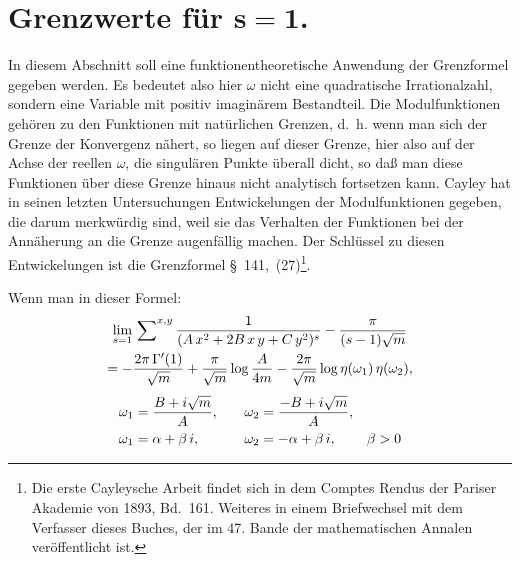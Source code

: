\documentclass[12pt,a4paper]{article}
\theoremstyle{definition}
\begin{document}
\vspace{12pt}

\section{Grenzwerte für $\boldsymbol{s = 1}$.}

In diesem Abschnitt soll eine funktionentheoretische Anwendung der 
Grenzformel gegeben werden. Es bedeutet also hier $\omega$ nicht eine 
quadratische Irrationalzahl, sondern eine Variable mit positiv imaginärem 
Bestandteil. Die Modulfunktionen gehören zu den Funktionen mit natürlichen 
Grenzen, d.~h. wenn man sich der Grenze der Konvergenz nähert, so liegen 
auf dieser Grenze, hier also auf der Achse der reellen $\omega$, die 
singulären Punkte überall dicht, so daß man diese Funktionen über diese 
Grenze hinaus nicht analytisch fortsetzen kann. Cayley hat in seinen 
letzten Untersuchungen Entwickelungen der Modulfunktionen gegeben, die 
darum merkwürdig sind, weil sie das Verhalten der Funktionen bei der 
Annäherung an die Grenze augenfällig machen. Der Schlüssel zu diesen 
Entwickelungen ist die Grenzformel \S~141,~(27)\footnote{Die erste Cayleysche 
Arbeit findet sich in dem Comptes Rendus der Pariser Akademie von 1893, 
Bd.~161. Weiteres in einem Briefwechsel mit dem Verfasser dieses Buches, 
der im 47. Bande der mathematischen Annalen veröffentlicht ist.}.

Wenn man in dieser Formel:
\begin{multline}
\lim_{s=1}\sideset{}{^{x,y}}\sum
\frac{1}{(A\,x^{2} + 2B\,x\,y + C\,y^{2})^{s}}
- \frac{\pi}{(s-1)\sqrt{m}}\\
= -\frac{2\pi\,\Gamma'(1)}{\sqrt{m}} + \frac{\pi}{\sqrt{m}}\log\frac{A}{4m}
- \frac{2\pi}{\sqrt{m}}\log\eta(\omega_{1})\,\eta(\omega_{2}),
\end{multline}
\begin{alignat}{3}
\omega_{1} &= \frac{B + i\sqrt{m}}{A},\quad & \omega_{2} &= \frac{-B + i\sqrt{m}}{A},\notag\\
\omega_{1} &= \alpha + \beta\,i,\quad & \omega_{2} &= -\alpha + \beta\,i,\quad & \beta > 0
\end{alignat}
\end{document}
